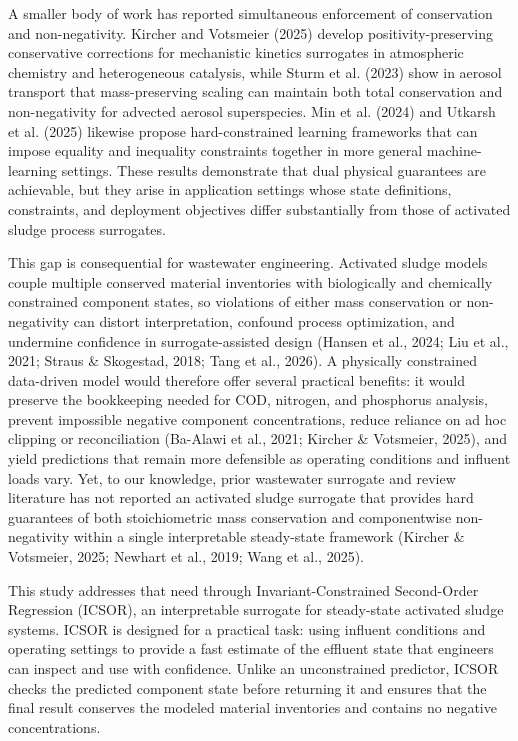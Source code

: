 \documentclass[a4paper,fleqn]{cas-sc}
\newenvironment{currentrevblock}{\begingroup\color{currentRevisionBlue}}{\endgroup}
\newenvironment{currentrevblock}{}{}
\newenvironment{revblock}{}{}
\begin{document}
\begin{revblock}
A smaller body of work has reported simultaneous enforcement of conservation and non-negativity. Kircher and Votsmeier (2025) develop positivity-preserving conservative corrections for mechanistic kinetics surrogates in atmospheric chemistry and heterogeneous catalysis, while Sturm et al. (2023) show in aerosol transport that mass-preserving scaling can maintain both total conservation and non-negativity for advected aerosol superspecies. Min et al. (2024) and Utkarsh et al. (2025) likewise propose hard-constrained learning frameworks that can impose equality and inequality constraints together in more general machine-learning settings. These results demonstrate that dual physical guarantees are achievable, but they arise in application settings whose state definitions, constraints, and deployment objectives differ substantially from those of activated sludge process surrogates.

This gap is consequential for wastewater engineering. Activated sludge models couple multiple conserved material inventories with biologically and chemically constrained component states, so violations of either mass conservation or non-negativity can distort interpretation, confound process optimization, and undermine confidence in surrogate-assisted design (Hansen et al., 2024; Liu et al., 2021; Straus \& Skogestad, 2018; Tang et al., 2026). A physically constrained data-driven model would therefore offer several practical benefits: it would preserve the bookkeeping needed for COD, nitrogen, and phosphorus analysis, prevent impossible negative component concentrations, reduce reliance on ad hoc clipping or reconciliation (Ba-Alawi et al., 2021; Kircher \& Votsmeier, 2025), and yield predictions that remain more defensible as operating conditions and influent loads vary. Yet, to our knowledge, prior wastewater surrogate and review literature has not reported an activated sludge surrogate that provides hard guarantees of both stoichiometric mass conservation and componentwise non-negativity within a single interpretable steady-state framework (Kircher \& Votsmeier, 2025; Newhart et al., 2019; Wang et al., 2025).

\begin{currentrevblock}
This study addresses that need through Invariant-Constrained Second-Order Regression (ICSOR), an interpretable surrogate for steady-state activated sludge systems. ICSOR is designed for a practical task: using influent conditions and operating settings to provide a fast estimate of the effluent state that engineers can inspect and use with confidence. Unlike an unconstrained predictor, ICSOR checks the predicted component state before returning it and ensures that the final result conserves the modeled material inventories and contains no negative concentrations.
\end{currentrevblock}


\end{revblock}
\end{document}
